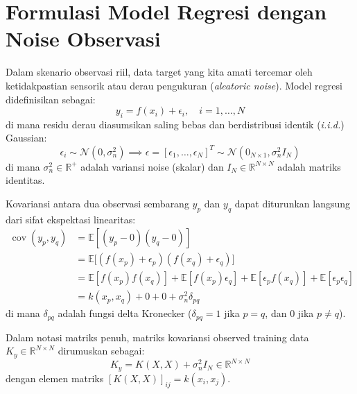 \documentclass[11pt,a4paper]{article}
\def\boldsymbol#1{#1}%
\def\mathbf#1{#1}%
\begin{document}
\section{Formulasi Model Regresi dengan Noise Observasi}
\label{sec:model_regresi}

Dalam skenario observasi riil, data target yang kita amati tercemar oleh ketidakpastian sensorik atau derau pengukuran (\textit{aleatoric noise}). Model regresi didefinisikan sebagai:
\begin{equation}
y_i = f(\mathbf{x}_i) + \epsilon_i, \quad i = 1, \dots, N
\end{equation}
di mana residu derau diasumsikan saling bebas dan berdistribusi identik (\textit{i.i.d.}) Gaussian:
\begin{equation}
\epsilon_i \sim \mathcal{N}(0, \sigma_n^2) \implies \boldsymbol{\epsilon} = [\epsilon_1, \dots, \epsilon_N]^T \sim \mathcal{N}(\mathbf{0}_{N \times 1}, \sigma_n^2 I_N)
\end{equation}
di mana $\sigma_n^2 \in \mathbb{R}^+$ adalah variansi noise (skalar) dan $I_N \in \mathbb{R}^{N \times N}$ adalah matriks identitas.

Kovariansi antara dua observasi sembarang $y_p$ dan $y_q$ dapat diturunkan langsung dari sifat ekspektasi linearitas:
\begin{align}
\operatorname{cov}(y_p, y_q) &= \mathbb{E}[(y_p - 0)(y_q - 0)] \nonumber \\
&= \mathbb{E}\big[ (f(\mathbf{x}_p) + \epsilon_p)(f(\mathbf{x}_q) + \epsilon_q) \big] \nonumber \\
&= \mathbb{E}[f(\mathbf{x}_p)f(\mathbf{x}_q)] + \mathbb{E}[f(\mathbf{x}_p)\epsilon_q] + \mathbb{E}[\epsilon_p f(\mathbf{x}_q)] + \mathbb{E}[\epsilon_p \epsilon_q] \nonumber \\
&= k(\mathbf{x}_p, \mathbf{x}_q) + 0 + 0 + \sigma_n^2 \delta_{pq}
\end{align}
di mana $\delta_{pq}$ adalah fungsi delta Kronecker ($\delta_{pq} = 1$ jika $p=q$, dan $0$ jika $p \neq q$).

Dalam notasi matriks penuh, matriks kovariansi observed training data $K_y \in \mathbb{R}^{N \times N}$ dirumuskan sebagai:
\begin{equation}
\label{eq:Ky}
K_y = K(X, X) + \sigma_n^2 I_N \in \mathbb{R}^{N \times N}
\end{equation}
dengan elemen matriks $[K(X, X)]_{ij} = k(\mathbf{x}_i, \mathbf{x}_j)$.
\end{document}
